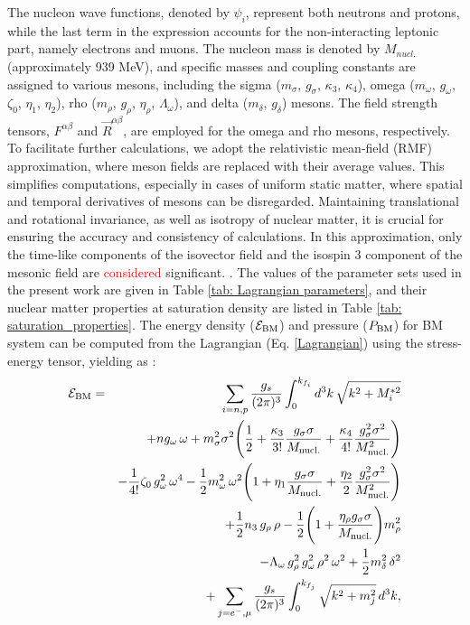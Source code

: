 The nucleon wave functions, denoted by $\psi_{i}$, represent both neutrons and protons, while the last term in the expression accounts for the non-interacting leptonic part, namely electrons and muons. The nucleon mass is denoted by $M_{nucl.}$ (approximately 939 MeV), and specific masses and coupling constants are assigned to various mesons, including the sigma ($m_\sigma$, $g_\sigma$, $\kappa_3$, $\kappa_4$), omega ($m_\omega$, $g_\omega$, $\zeta_0$, $\eta_1$, $\eta_2$), rho ($m_\rho$, $g_\rho$, $\eta_\rho$, $\Lambda_\omega$), and delta ($m_\delta$, $g_\delta$) mesons. The field strength tensors, $F^{\alpha\beta}$ and $\vec R^{\alpha\beta}$, are employed for the omega and rho mesons, respectively.
To facilitate further calculations, we adopt the relativistic mean-field (RMF) approximation, where meson fields are replaced with their average values. This simplifies computations, especially in cases of uniform static matter, where spatial and temporal derivatives of mesons can be disregarded. Maintaining translational and rotational invariance, as well as isotropy of nuclear matter, it is crucial for ensuring the accuracy and consistency of calculations. In this approximation, only the time-like components of the isovector field and the isospin 3 component of the mesonic field are \textcolor{red}{considered} significant.  \cite{ERMF6, Serot1992, ERMF7, E-RMF8, E-RMF9, E-RMF5, PhysRevC.97.045806}. The values of the parameter sets used in the present work are given in Table \ref{tab: Lagrangian parameters}, and their nuclear matter properties at saturation density are listed in Table \ref{tab: saturation_properties}.  The energy density ($\mathcal{E}_{\rm BM}$) and pressure ($P_{\rm BM}$) for BM system can be computed from the Lagrangian (Eq. \ref{Lagrangian}) using the stress-energy tensor, yielding as \cite{E-RMF5}:  
\begin{eqnarray}
	\label{eq:eden}
	{\cal E}_{\rm BM} & = & \sum_{i=n,p} \frac{g_s}{(2\pi)^{3}}\int_{0}^{k_{f_{i}}} d^{3}k\, \sqrt{k^{2} + M_{i}^{*2}}\nonumber\\
	&&
	+n g_\omega\,\omega+m_{\sigma}^2{\sigma}^2\Bigg(\frac{1}{2}+\frac{\kappa_{3}}{3!}\frac{g_\sigma\sigma}{M_{\rm nucl.}}+\frac{\kappa_4}{4!}\frac{g_\sigma^2\sigma^2}{M_{\rm nucl.}^2}\Bigg)
	\nonumber\\
	&&
	-\frac{1}{4!}\zeta_{0}\,{g_{\omega}^2}\,\omega^4
	-\frac{1}{2}m_{\omega}^2\,\omega^2\Bigg(1+\eta_{1}\frac{g_\sigma\sigma}{M_{\rm nucl.}}+\frac{\eta_{2}}{2}\frac{g_\sigma^2\sigma^2}{M_{\rm nucl.}^2}\Bigg)
	\nonumber\\
	&&
	+ \frac{1}{2} n_3 \,g_\rho\,\rho
	-\frac{1}{2}\Bigg(1+\frac{\eta_{\rho}g_\sigma\sigma}{M_{\rm nucl.}}\Bigg)m_{\rho}^2
	\nonumber\\
	&& 
	-\Lambda_{\omega}\, g_\rho^2\, g_\omega^2\, \rho^2\, \omega^2
	+\frac{1}{2}m_{\delta}^2\, \delta^{2}
	\nonumber\\
	&& 
	+\sum_{j=e^{-},\mu}  \frac{g_s}{(2\pi)^{3}}\int_{0}^{k_{f_{j}}} \sqrt{k^2 + m^2_{j}} \, d^{3}k,
\end{eqnarray}
